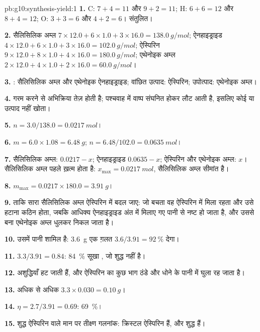 \begin{solution}{pb:g10:synthesis-yield:1}
\textbf{1.} C: $7 + 4 = 11$ और $9 + 2 = 11$; H: $6 + 6 = 12$ और
$8 + 4 = 12$; O: $3 + 3 = 6$ और $4 + 2 = 6$। संतुलित।

\textbf{2.} सैलिसिलिक अम्ल $7 \times 12.0 + 6 \times 1.0 + 3 \times 16.0
= \qty{138.0}{g/mol}$; ऐनहाइड्राइड $4 \times 12.0 + 6 \times 1.0 +
3 \times 16.0 = \qty{102.0}{g/mol}$; ऐस्पिरिन $9 \times 12.0 + 8 \times
1.0 + 4 \times 16.0 = \qty{180.0}{g/mol}$; एथेनोइक अम्ल $2 \times 12.0
+ 4 \times 1.0 + 2 \times 16.0 = \qty{60.0}{g/mol}$।

\textbf{3.} : सैलिसिलिक अम्ल और एथेनोइक ऐनहाइड्राइड; वांछित
उत्पाद: ऐस्पिरिन; उपोत्पाद: एथेनोइक अम्ल।

\textbf{4.} गरम करने से अभिक्रिया तेज़ होती है; पश्चवाह में वाष्प
संघनित होकर लौट आती है, इसलिए कोई  या उत्पाद नहीं खोता।

\textbf{5.} $n = 3.0 / 138.0 = \qty{0.0217}{mol}$।

\textbf{6.} $m = 6.0 \times 1.08 = \qty{6.48}{g}$;
$n = 6.48 / 102.0 = \qty{0.0635}{mol}$।

\textbf{7.} सैलिसिलिक अम्ल: $0.0217 - x$; ऐनहाइड्राइड $0.0635 - x$;
ऐस्पिरिन और एथेनोइक अम्ल: $x$। सैलिसिलिक अम्ल पहले ख़त्म होता है:
$x_{\max} = \qty{0.0217}{mol}$, सैलिसिलिक अम्ल सीमांत है।

\textbf{8.} $m_{\max} = 0.0217 \times 180.0 = \qty{3.91}{g}$।

\textbf{9.} ताकि सारा सैलिसिलिक अम्ल ऐस्पिरिन में बदल जाए: जो बचता वह ऐस्पिरिन
में मिला रहता और उसे हटाना कठिन होता, जबकि आधिक्य ऐनहाइड्राइड अंत में मिलाए गए पानी
से नष्ट हो जाता है, और उससे बना एथेनोइक अम्ल धुलकर
निकल जाता है।

\textbf{10.} उसमें पानी शामिल है: \qty{3.6}{g} एक ग़लत
$3.6 / 3.91 = \qty{92}{\percent}$ देगा।

\textbf{11.} $3.3 / 3.91 = 0.84$: \qty{84}{\percent} सूखा , जो शुद्ध नहीं है।

\textbf{12.} अशुद्धियाँ हट जाती हैं, और ऐस्पिरिन का कुछ भाग ठंडे  और
धोने के पानी में घुला रह जाता है।

\textbf{13.} अधिक से अधिक $3.3 \times 0.030 = \qty{0.10}{g}$।

\textbf{14.} $\eta = 2.7 / 3.91 = 0.69$: \qty{69}{\percent}।

\textbf{15.} शुद्ध ऐस्पिरिन वाले मान पर तीक्ष्ण गलनांक: क्रिस्टल
ऐस्पिरिन हैं, और शुद्ध हैं।


\end{solution}
